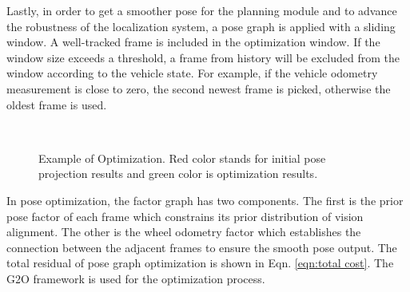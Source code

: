 \documentclass[letterpaper, 10 pt, conference]{ieeeconf}
\newcommand{\hlr}[1]{{\color{red}{#1}}}
\begin{document}




 

Lastly, in order to get a smoother pose for the planning module and to advance the robustness of the localization system, a pose graph is applied with a sliding window.
A well-tracked frame is included in the optimization window. If the window size exceeds a threshold, a frame from history will be excluded from the window  according to the vehicle state. For example, if the vehicle odometry measurement is close to zero, the second newest frame is picked, otherwise the oldest frame is used.

\begin{figure}[htb]
  \\
  \caption{Example of Optimization. Red color stands for initial pose projection results and green color is optimization results.} 
  \label{figure:before after}
\end{figure}

In pose optimization, the factor graph has two components. The first is the prior pose factor of each frame which constrains its prior distribution of vision alignment. The other is the wheel odometry factor which establishes the connection between the adjacent frames to ensure the smooth pose output. The total residual of pose graph optimization is shown in Eqn. \ref{eqn:total cost}. The G2O \cite{grisetti2011g2o} framework is used for the optimization process.
\end{document}
